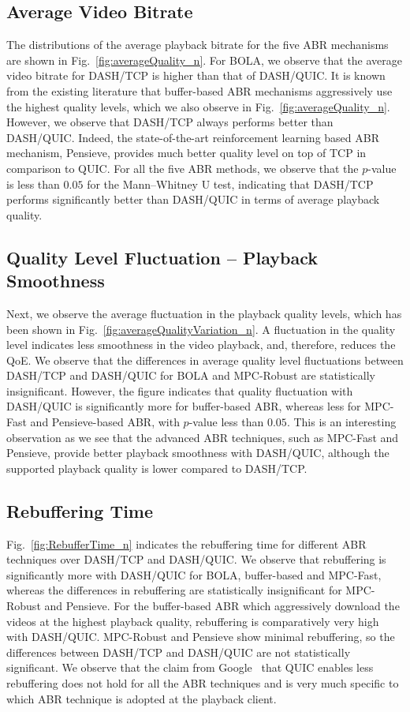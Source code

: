 \subsection{Average Video Bitrate}
The distributions of the average playback bitrate for the five ABR mechanisms are shown in Fig.~\ref{fig:averageQuality_n}. For BOLA, we observe that the average video bitrate for DASH/TCP is higher than that of DASH/QUIC. It is known from the existing literature that buffer-based ABR mechanisms aggressively use the highest quality levels, which we also observe in Fig.~\ref{fig:averageQuality_n}. However, we observe that DASH/TCP always performs better than DASH/QUIC. Indeed, the state-of-the-art reinforcement learning based ABR mechanism, Pensieve, provides much better quality level on top of TCP in comparison to QUIC. For all the five ABR methods, we observe that the $p$-value is less than $0.05$ for the Mann–Whitney U test, indicating that DASH/TCP performs significantly better than DASH/QUIC in terms of average playback quality.

\subsection{Quality Level Fluctuation -- Playback Smoothness}
Next, we observe the average fluctuation in the playback quality levels, which has been shown in Fig.~\ref{fig:averageQualityVariation_n}. A fluctuation in the quality level indicates less smoothness in the video playback, and, therefore, reduces the QoE. We observe that the differences in average quality level fluctuations between DASH/TCP and DASH/QUIC for BOLA and MPC-Robust are statistically insignificant. However, the figure indicates that quality fluctuation with DASH/QUIC is significantly more for buffer-based ABR, whereas less for MPC-Fast and Pensieve-based ABR, with $p$-value less than $0.05$. This is an interesting observation as we see that the advanced ABR techniques, such as MPC-Fast and Pensieve, provide better playback smoothness with DASH/QUIC, although the supported playback quality is lower compared to DASH/TCP. 


\subsection{Rebuffering Time}
Fig.~\ref{fig:RebufferTime_n} indicates the rebuffering time for different ABR techniques over DASH/TCP and DASH/QUIC. We observe that rebuffering is significantly more with DASH/QUIC for BOLA, buffer-based and MPC-Fast, whereas the differences in rebuffering are statistically insignificant for MPC-Robust and Pensieve. For the buffer-based ABR which aggressively download the videos at the highest playback quality, rebuffering is comparatively very high with DASH/QUIC. MPC-Robust and Pensieve show minimal rebuffering, so the differences between DASH/TCP and DASH/QUIC are not statistically significant. We observe that the claim from Google~\cite{langley2017quic} that QUIC enables less rebuffering does not hold for all the ABR techniques and is very much specific to which ABR technique is adopted at the playback client.  


